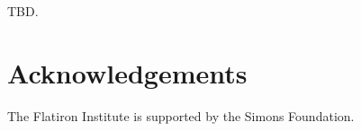 \documentclass[a4paper,fleqn,usenatbib]{mnras}
\begin{document}
TBD.


\section*{Acknowledgements}

The Flatiron Institute is supported by the Simons Foundation.


%



\bsp	%
\label{lastpage}
\end{document}

